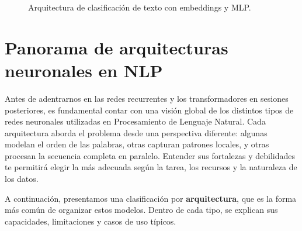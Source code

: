 \documentclass[12pt,a4paper,openany,oneside]{book}
\begin{document}
\begin{figure}[h]
\centering
{}
\caption{Arquitectura de clasificación de texto con embeddings y MLP.}
\label{fig:textclf}
\end{figure}






\section{Panorama de arquitecturas neuronales en NLP}
Antes de adentrarnos en las redes recurrentes y los transformadores en sesiones posteriores, es fundamental contar con una visión global de los distintos tipos de redes neuronales utilizadas en Procesamiento de Lenguaje Natural. Cada arquitectura aborda el problema desde una perspectiva diferente: algunas modelan el orden de las palabras, otras capturan patrones locales, y otras procesan la secuencia completa en paralelo. Entender sus fortalezas y debilidades te permitirá elegir la más adecuada según la tarea, los recursos y la naturaleza de los datos.

A continuación, presentamos una clasificación por \textbf{arquitectura}, que es la forma más común de organizar estos modelos. Dentro de cada tipo, se explican sus capacidades, limitaciones y casos de uso típicos.
\end{document}
